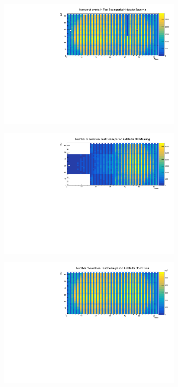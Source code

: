 \documentclass[12pt,a4paper]{article}
\begin{document}
\begin{figure}[!hbtp]
\centering
\begin{subfigure}[b]{\textwidth}
\centering
\includegraphics[width=.9\textwidth]{Plots/Attenprofs_P4Data_CellPlane_Epoch4a.pdf}
\end{subfigure}
\begin{subfigure}[b]{\textwidth}
\centering
\includegraphics[width=.9\textwidth]{Plots/Attenprofs_P4Data_CellPlane_CellMasking.pdf}
\end{subfigure}
\begin{subfigure}[b]{\textwidth}
\centering
\includegraphics[width=.9\textwidth]{Plots/Attenprofs_P4Data_CellPlane_GoodRuns.pdf}

\end{subfigure}
\end{figure}
\end{document}
